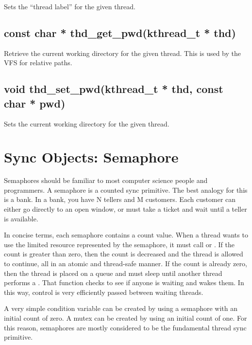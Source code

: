 \documentclass[english]{report}
\begin{document}
Sets the ``thread label'' for the given thread.


\subsection{const char * thd\_get\_pwd(kthread\_t * thd)}

Retrieve the current working directory for the given thread. This
is used by the VFS for relative paths.


\subsection{void thd\_set\_pwd(kthread\_t * thd, const char * pwd)}

Sets the current working directory for the given thread.


\section{Sync Objects: Semaphore}

Semaphores should be familiar to most computer science people and
programmers. A semaphore is a counted sync primitive. The best analogy
for this is a bank. In a bank, you have N tellers and M customers.
Each customer can either go directly to an open window, or must take
a ticket and wait until a teller is available.

In concise terms, each semaphore contains a count value. When a thread
wants to use the limited resource represented by the semaphore, it
must call  or . If the
count is greater than zero, then the count is decreased and the thread
is allowed to continue, all in an atomic and thread-safe manner. If
the count is already zero, then the thread is placed on a queue and
must sleep until another thread performs a . That
function checks to see if anyone is waiting and wakes them. In this
way, control is very efficiently passed between waiting threads.

A very simple condition variable can be created by using a semaphore
with an initial count of zero. A mutex can be created by using an
initial count of one. For this reason, semaphores are mostly considered
to be the fundamental thread sync primitive.

\end{document}

